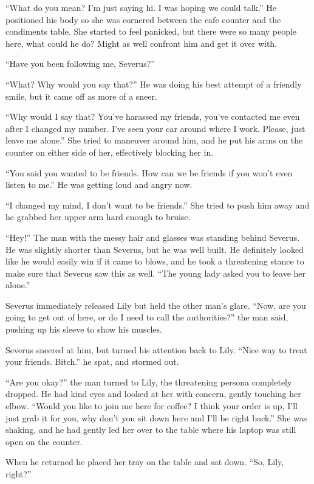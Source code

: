 \documentclass[12pt,twoside,openright]{memoir}
\begin{document}
``What do you mean? I'm just saying hi. I was hoping we could talk.'' He positioned his body so she was cornered between the cafe counter and the condiments table. She started to feel panicked, but there were so many people here, what could he do? Might as well confront him and get it over with.

``Have you been following me, Severus?''

``What? Why would you say that?'' He was doing his best attempt of a friendly smile, but it came off as more of a sneer.

``Why would I say that? You've harassed my friends, you've contacted me even after I changed my number. I've seen your car around where I work. Please, just leave me alone.'' She tried to maneuver around him, and he put his arms on the counter on either side of her, effectively blocking her in.

``You said you wanted to be friends. How can we be friends if you won't even listen to me.'' He was getting loud and angry now.

``I changed my mind, I don't want to be friends.'' She tried to push him away and he grabbed her upper arm hard enough to bruise.

``Hey!'' The man with the messy hair and glasses was standing behind Severus. He was slightly shorter than Severus, but he was well built. He definitely looked like he would easily win if it came to blows, and he took a threatening stance to make sure that Severus saw this as well. ``The young lady asked you to leave her alone.''

Severus immediately released Lily but held the other man's glare. ``Now, are you going to get out of here, or do I need to call the authorities?'' the man said, pushing up his sleeve to show his muscles.

Severus sneered at him, but turned his attention back to Lily. ``Nice way to treat your friends. Bitch.'' he spat, and stormed out.

``Are you okay?'' the man turned to Lily, the threatening persona completely dropped. He had kind eyes and looked at her with concern, gently touching her elbow. ``Would you like to join me here for coffee? I think your order is up, I'll just grab it for you, why don't you sit down here and I'll be right back.'' She was shaking, and he had gently led her over to the table where his laptop was still open on the counter.

When he returned he placed her tray on the table and sat down. ``So, Lily, right?''
\end{document}
